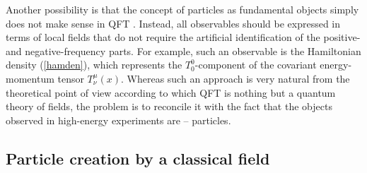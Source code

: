 \documentclass[12pt]{article}
\begin{document}
Another possibility is that the concept of particles as fundamental
objects simply does not make sense in QFT \cite{birdav,dav}.
Instead, all observables should be expressed in terms of local 
fields that do not require the artificial identification of the 
positive- and negative-frequency parts. For example, such an observable
is the Hamiltonian density (\ref{hamden}), which represents
the $T^0_0$-component of the covariant energy-momentum tensor
$T^{\mu}_{\nu}(x)$. Whereas such an approach is very natural from 
the theoretical point of view according to which QFT is nothing
but a quantum theory of fields, the problem is to reconcile 
it with the fact that the objects observed in high-energy 
experiments are -- particles.  

\subsection{Particle creation by a classical field}
\end{document}

